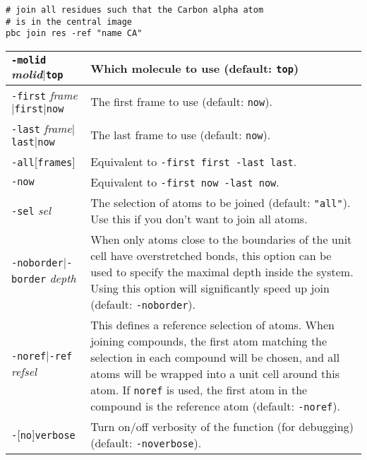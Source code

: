 \documentclass[a4paper, DIV12]{scrartcl}
\begin{document}

\begin{Verbatim}
# join all residues such that the Carbon alpha atom 
# is in the central image
pbc join res -ref "name CA"
\end{Verbatim}


\begin{tabular}{|p{}|p{}|}
\hline

\texttt{-molid} \textit{molid}$|$\texttt{top}
& Which molecule to use (default: \texttt{top})
\\ \hline

\texttt{-first} \textit{frame}$|$\texttt{first}$|$\texttt{now}
& The first frame to use (default: \texttt{now}). 
\\ \hline

\texttt{-last} \textit{frame}$|$\texttt{last}$|$\texttt{now}
& The last frame to use (default: \texttt{now}).
\\ \hline

\texttt{-all}[\texttt{frames}]
& Equivalent to \texttt{-first first -last last}.
\\ \hline

\texttt{-now}
& Equivalent to \texttt{-first now -last now}.
\\ \hline

\texttt{-sel} \textit{sel}
& The selection of atoms to be joined (default: \texttt{"all"}). Use
this if you don't want to join all atoms.
\\ \hline

\texttt{-noborder}$|$\texttt{-border} \textit{depth}
& When only atoms close to the boundaries of the unit cell have
overstretched bonds, this option can be used to specify the maximal
depth inside the system. Using this option will significantly speed up
join (default: \texttt{-noborder}).
\\ \hline

\texttt{-noref}$|$\texttt{-ref} \textit{refsel}
& This defines a reference selection of atoms. When joining compounds,
the first atom matching the selection in each compound will be chosen,
and all atoms will be wrapped into a unit cell around this atom. If
\texttt{noref} is used, the first atom in the compound is the
reference atom (default: \texttt{-noref}).
\\ \hline

\texttt{-}[\texttt{no}]\texttt{verbose}
& Turn on/off verbosity of the function (for debugging) (default:
\texttt{-noverbose}).
\\ \hline
\end{tabular}
\end{document}
